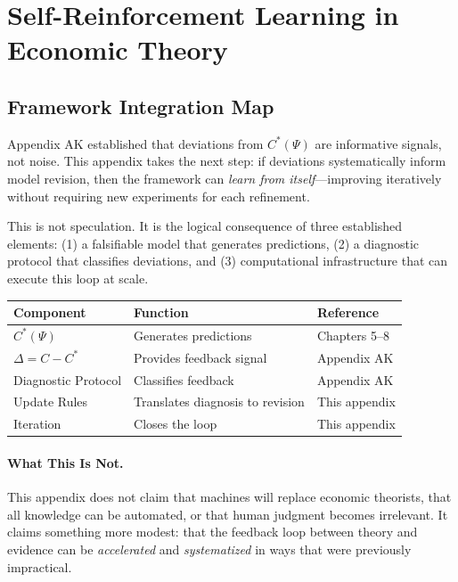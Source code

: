 \section{Self-Reinforcement Learning in Economic Theory}
\label{app:self-reinforcement}

\subsection{Framework Integration Map}

Appendix AK established that deviations from $C^*(\Psi)$ are informative signals, 
not noise. This appendix takes the next step: if deviations systematically 
inform model revision, then the framework can \emph{learn from itself}---improving 
iteratively without requiring new experiments for each refinement.

This is not speculation. It is the logical consequence of three established 
elements: (1) a falsifiable model that generates predictions, (2) a diagnostic 
protocol that classifies deviations, and (3) computational infrastructure that 
can execute this loop at scale.

\begin{center}
\renewcommand{\arraystretch}{1.4}
\begin{tabular}{|l|l|l|}
\hline
\textbf{Component} & \textbf{Function} & \textbf{Reference} \\
\hline
$C^*(\Psi)$ & Generates predictions & Chapters 5--8 \\
$\Delta = C - C^*$ & Provides feedback signal & Appendix AK \\
Diagnostic Protocol & Classifies feedback & Appendix AK \\
Update Rules & Translates diagnosis to revision & This appendix \\
Iteration & Closes the loop & This appendix \\
\hline
\end{tabular}
\end{center}

\paragraph{What This Is Not.}
This appendix does not claim that machines will replace economic theorists, 
that all knowledge can be automated, or that human judgment becomes irrelevant. 
It claims something more modest: that the feedback loop between theory and 
evidence can be \emph{accelerated} and \emph{systematized} in ways that were 
previously impractical.


